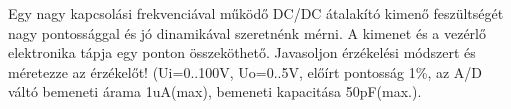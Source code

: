 \begin{example}

Egy nagy kapcsolási frekvenciával működő DC/DC átalakító kimenő feszültségét nagy pontossággal és jó dinamikával szeretnénk mérni. A kimenet és a vezérlő elektronika tápja egy ponton összeköthető. Javasoljon érzékelési módszert és méretezze az érzékelőt! (Ui=0..100V, Uo=0..5V, előírt pontosság 1\%, az A/D váltó bemeneti árama 1uA(max), bemeneti kapacitása 50pF(max.).

\tcbline
\vspace{1mm}

\solution

\end{example}